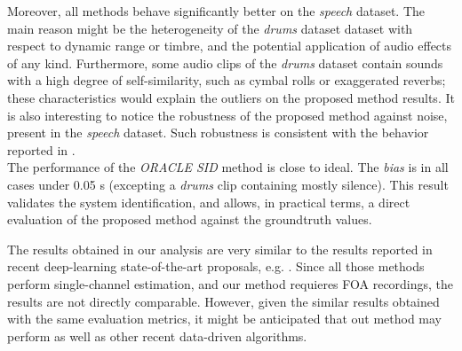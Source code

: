 Moreover, all methods behave significantly better on the \textit{speech} dataset. The main reason might be the heterogeneity of the \textit{drums} dataset dataset with respect to dynamic range or timbre, and the potential application of audio effects of any kind.
Furthermore, some audio clips of the \textit{drums} dataset contain sounds with a high degree of self-similarity, such as cymbal rolls or exaggerated reverbs; these characteristics would explain the outliers on the proposed method results.
It is also interesting to notice the robustness of the proposed method against noise, present in the \textit{speech} dataset. 
Such robustness is consistent with the behavior reported in \cite{jukic2015group}.\\

The performance of the \textit{ORACLE SID} method is close to ideal. The \textit{bias} is in all cases under 0.05 s (excepting a \textit{drums} clip containing mostly silence).
This result validates the system identification, and allows, in practical terms, a direct evaluation of the proposed method against the groundtruth values.

The results obtained in our analysis are very similar to the results reported in recent deep-learning state-of-the-art proposals, e.g. \cite{gamper2018blind}. 
Since all those methods perform single-channel estimation, and our method requieres FOA recordings, the results are not directly comparable. However, given the similar results obtained with the same evaluation metrics, it might be anticipated that out method may perform as well as other recent data-driven algorithms.



